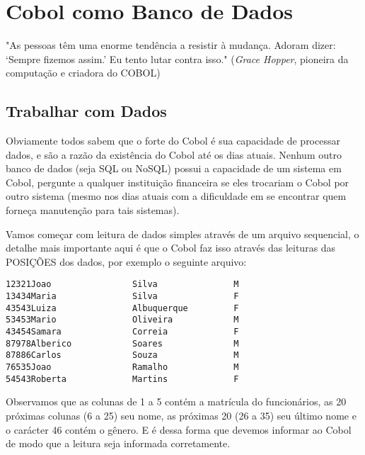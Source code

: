 \chapter{Cobol como Banco de Dados}

\begin{remark}
	"As pessoas têm uma enorme tendência a resistir à mudança. Adoram dizer: ‘Sempre fizemos assim.’ Eu tento lutar contra isso." (\textit{Grace Hopper}, pioneira da computação e criadora do COBOL)
\end{remark}

\section{Trabalhar com Dados}
Obviamente todos sabem que o forte do Cobol é sua capacidade de processar dados, e são a razão da existência do Cobol até os dias atuais. Nenhum outro banco de dados (seja SQL ou NoSQL) possui a capacidade de um sistema em Cobol, pergunte a qualquer instituição financeira se eles trocariam o Cobol por outro sistema (mesmo nos dias atuais com a dificuldade em se encontrar quem forneça manutenção para tais sistemas).

Vamos começar com leitura de dados simples através de um arquivo sequencial, o detalhe mais importante aqui é que o Cobol faz isso através das leituras das POSIÇÕES dos dados, por exemplo o seguinte arquivo:

\begin{lstlisting}[]
12321Joao                Silva               M
13434Maria               Silva               F
43543Luiza               Albuquerque         F
53453Mario               Oliveira            M
43454Samara              Correia             F
87978Alberico            Soares              M
87886Carlos              Souza               M
76535Joao                Ramalho             M
54543Roberta             Martins             F
\end{lstlisting}

Observamos que as colunas de 1 a 5 contém a matrícula do funcionários, as 20 próximas colunas (6 a 25) seu nome, as próximas 20 (26 a 35) seu último nome e o carácter 46 contém o gênero. E é dessa forma que devemos informar ao Cobol de modo que a leitura seja informada corretamente.

